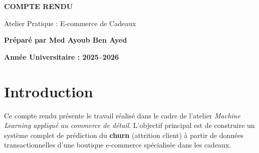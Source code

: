 \documentclass[11pt,a4paper]{article}
\begin{document}
\begin{titlepage}

\vspace{6cm}

\begin{center}
{\LARGE\textbf{COMPTE RENDU}}\par
\vspace{1cm}
{\large Atelier Pratique : E-commerce de Cadeaux}\par
\vspace{2cm}
{\large \textbf{Préparé par Med Ayoub Ben Ayed}}
\vspace{3cm}


\vspace{2cm}

{\textbf{Année Universitaire : 2025--2026}}
\end{center}
\vfill
\end{titlepage}

\tableofcontents
\newpage

\section{Introduction}

Ce compte rendu présente le travail réalisé dans le cadre de l'atelier \textit{Machine Learning appliqué au commerce de détail}. L'objectif principal est de construire un système complet de prédiction du \textbf{churn} (attrition client) à partir de données transactionnelles d'une boutique e-commerce spécialisée dans les cadeaux.
\end{document}
